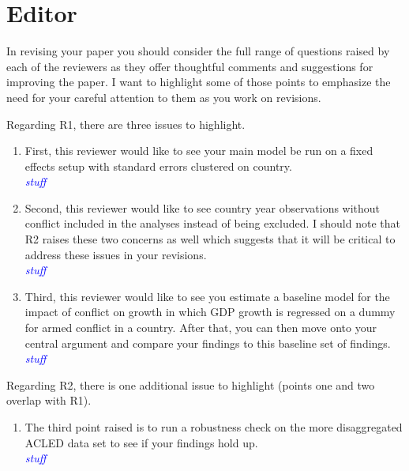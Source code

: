 \section{Editor}


In revising your paper you should consider the full range of questions raised by each of the reviewers as they offer thoughtful comments and suggestions for improving the paper. I want to highlight some of those points to emphasize the need for your careful attention to them as you work on revisions.

Regarding R1, there are three issues to highlight. 
\begin{enumerate}
\item  First, this reviewer would like to see your main model be run on a fixed effects setup with standard errors clustered on country. \\

\textcolor{blue}{\emph{stuff}}

\item Second, this reviewer would like to see country year observations without conflict included in the analyses instead of being excluded. I should note that R2 raises these two concerns as well which suggests that it will be critical to address these issues in your revisions. \\

\textcolor{blue}{\emph{stuff}}

\item Third, this reviewer would like to see you estimate a baseline model for the impact of conflict on growth in which GDP growth is regressed on a dummy for armed conflict in a country. After that, you can then move onto your central argument and compare your findings to this baseline set of findings. \\

\textcolor{blue}{\emph{stuff}}

\end{enumerate}

Regarding R2, there is one additional issue to highlight (points one and two overlap with R1).

\begin{enumerate}
\item The third point raised is to run a robustness check on the more disaggregated ACLED data set to see if your findings hold up. \\

\textcolor{blue}{\emph{stuff}}

\end{enumerate}